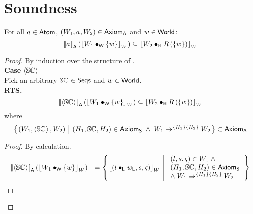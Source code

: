 \newpage
\section*{Soundness}
\begin{lemma}
For all $a_{} \in \textsf{Atom}$, $\left(W_1, a_{}, W_2\right) \in \textsf{Axiom}_{\textsf{A}}$ and $w \in \textsf{World}$:
%
\[
	\left[\!\left| a_{} \right |\! \right]_{\textsf{A}}\left( \left\lfloor W_1 \bullet_{\textsf{W}} \{w\} \right\rfloor_{W} \right) \subseteq \left\lfloor W_2 \bullet_{\mathbb{H}} R\left(\{w\}\right) \right\rfloor_{W}
\]
%
\begin{proof}
By induction over the structure of \atom{}.\\

\noindent\textbf{Case \hspace*{0.3cm}}$\left\langle \mathbb{SC}_{} \right\rangle$\\
Pick an arbitrary $\mathbb{SC}_{} \in \textsf{Seqs}$ and $w \in \textsf{World}$.\\
\textbf{RTS.}
%
\[
	\left[\!\left| \left\langle \mathbb{SC}_{} \right\rangle \right |\! \right]_{\textsf{A}}\left( \left\lfloor W_1 \bullet_{\textsf{W}} \{w\} \right\rfloor_{W} \right) \subseteq \left\lfloor W_2 \bullet_{\mathbb{H}} R\left(\{w\}\right) \right\rfloor_{W}
\]
%
where
%
\begin{align}
	\left\{
	\hspace*{-0.15cm}
	\begin{array}{l | l}
		 \left(W_1, \atomic{\seq{}}, W_2 \right) &
		 (H_1, \seq{}, H_2) \in \AxiomsSeq \;\land\; \repartitions{W_1}{W_2}{H_1}{H_2}
	\end{array}
	\hspace*{-0.15cm}
	\right\}
	\subset \AxiomsA
	\nonumber
\end{align}
%
\begin{proof}
By calculation.\\
%
\[
\begin{array}{r l}
	\opSemA{\atomic{\seq{}}}{\reifyW{W_1 \composeW \{w\}}} &
	= 
	\left\{
	\hspace*{-0.15cm}
	\begin{array}{l | l}
		\reifyW{\left(l \composeL \localPart{w}, s, \amod{}\right)}
		&
		\begin{array}{l}
			(l, s, \amod{}) \in W_1 \;\land\\ 
			(H_1, \seq{}, H_2) \in \AxiomsSeq \\
			\land\;\repartitions{W_1}{W_2}{H_1}{H_2}
		\end{array}			
	\end{array}
	\hspace*{-0.15cm}
	\right\}\\
	


\end{array}\]
\end{proof}
\end{proof}
\end{lemma}
